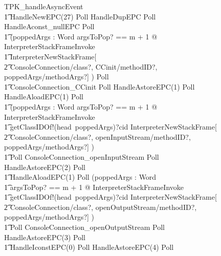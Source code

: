 \begin{figure}
  \small
  \setlength{\zedindent}{0pt}
  \setlength{\zedleftsep}{0pt}
  \setlength{\abovedisplayskip}{0pt}
  \setlength{\belowdisplayskip}{0pt}
  \setlength{\abovedisplayshortskip}{0pt}
  \setlength{\belowdisplayshortskip}{0pt}
  \begin{circus}
    TPK\_handleAsyncEvent \circdef \\
    \t1 HandleNewEPC(27) \circseq Poll \circseq HandleDupEPC \circseq Poll \circseq  HandleAconst\_nullEPC \circseq Poll \circseq \\
    \t1 (\circvar poppedArgs : \seq Word \circspot \lschexpract \exists argsToPop? == m + 1 @ InterpreterStackFrameInvoke \rschexpract \circseq \\
    \t1 \lschexpract InterpreterNewStackFrame[\\
    \t2 ConsoleConnection/class?, CCinit/methodID?, poppedArgs/methodArgs?] \rschexpract) \circseq Poll \circseq \\
    \t1 ConsoleConnection\_CCinit \circseq Poll \circseq HandleAstoreEPC(1) \circseq Poll \circseq HandleAloadEPC(1) \circseq Poll \circseq \\
    \t1 (\circvar poppedArgs : \seq Word \circspot \lschexpract \exists argsToPop? == m + 1 @ InterpreterStackFrameInvoke \rschexpract \circseq \\
    \t1 getClassIDOf!(head~poppedArgs)?cid \then \lschexpract InterpreterNewStackFrame[ \\
    \t2 ConsoleConnection/class?, openInputStream/methodID?, poppedArgs/methodArgs?] \rschexpract) \circseq \\
    \t1 Poll \circseq ConsoleConnection\_openInputStream \circseq Poll \circseq  HandleAstoreEPC(2) \circseq Poll \circseq \\
    \t1 HandleAloadEPC(1) \circseq Poll \circseq (\circvar poppedArgs : \seq Word \circspot \\
    \t1 \lschexpract \exists argsToPop? == m + 1 @ InterpreterStackFrameInvoke \rschexpract \circseq \\
    \t1 getClassIDOf!(head~poppedArgs)?cid \then \lschexpract InterpreterNewStackFrame[\\
    \t2 ConsoleConnection/class?, openOutputStream/methodID?, poppedArgs/methodArgs?] \rschexpract) \circseq \\
    \t1 Poll \circseq ConsoleConnection\_openOutputStream \circseq Poll \circseq HandleAstoreEPC(3) \circseq Poll \circseq \\
    \t1 HandleIconstEPC(0) \circseq Poll \circseq HandleAstoreEPC(4) \circseq Poll \circseq \\

\end{circus}
\end{figure}
